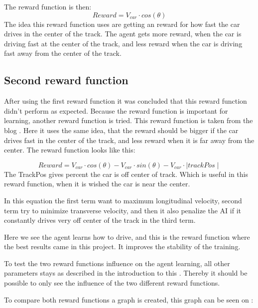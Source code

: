 The reward function is then:
\begin{equation}
Reward = V_{car} \cdot cos(\theta) 
\end{equation}
The idea this reward function uses are getting an reward for how fast the car drives in the center of the track. The agent gets more reward, when the car is driving fast at the center of the track, and less reward when the car is driving fast away from the center of the track. 

\subsection*{Second reward function}
After using the first reward function it was concluded that this reward function didn't perform as expected. Because the reward function is important for learning, another reward function is tried. This reward function is taken from the blog \cite{DDPG_Torcs}. Here it uses the same idea, that the reward should be bigger if the car drives fast in the center of the track, and less reward when it is far away from the center. The reward function looks like this:

\begin{equation}
Reward = V_{car} \cdot cos(\theta) - V_{car} \cdot sin(\theta) - V_{car} \cdot \mid trackPos\mid 
\end{equation}
The TrackPos gives percent the car is off center of track. Which is useful in this reward function, when it is wished the car is near the center.  

In this equation the first term want to maximum longitudinal velocity, second term try to minimize transverse velocity, and then it also penalize the AI if it constantly drives very off center of the track in the third term.

Here we see the agent learns how to drive, and this is the reward function where the best results came in this project. It improves the stability of the training.

To test the two reward functions influence on the agent learning, all other parameters stays as described in the introduction to this . Thereby it should be possible to only see the influence of the two different reward functions.

To compare both reward functions a graph is created, this graph can be seen on :

